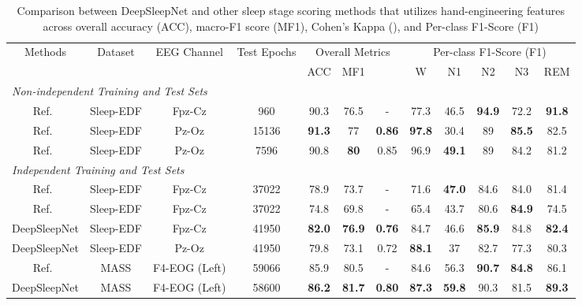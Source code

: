 \documentclass[journal,twoside]{IEEEtran}
\let\MYoriglatexcaption\caption
\renewcommand{\caption}[2][\relax]{\MYoriglatexcaption[#2]{#2}}
\begin{document}
\begin{table*}[!t]
\renewcommand{\arraystretch}{1.3}
\caption{Comparison between DeepSleepNet and other sleep stage scoring methods that utilizes hand-engineering features across overall accuracy (ACC), macro-F1 score (MF1), Cohen's Kappa (), and Per-class F1-Score (F1)}
\label{tab:comparison}
\centering
\begin{tabular}{|c|c|c|c|ccc|ccccc|}
\hline
\multirow{2}{*}{Methods} & \multirow{2}{*}{Dataset} & \multirow{2}{*}{EEG Channel} & \multirow{2}{*}{Test Epochs} & \multicolumn{3}{c|}{Overall Metrics} & \multicolumn{5}{c|}{Per-class F1-Score (F1)} \\
 &  &  &  & ACC & MF1 &  & W & N1 & N2 & N3 & REM \\ \hline
\multicolumn{12}{|l|}{\textit{Non-independent Training and Test Sets}} \\ \hline
Ref.~\cite{hsu2013} & Sleep-EDF & Fpz-Cz & 960 & 90.3 & 76.5 & - & 77.3 & 46.5 & \textbf{94.9} & 72.2 & \textbf{91.8} \\
Ref.~\cite{sharma2017} & Sleep-EDF & Pz-Oz & 15136 & \textbf{91.3} & 77 & \textbf{0.86} & \textbf{97.8} & 30.4 & 89 & \textbf{85.5} & 82.5 \\
Ref.~\cite{hassan2017} & Sleep-EDF & Pz-Oz & 7596 & 90.8 & \textbf{80} & 0.85 & 96.9 & \textbf{49.1} & 89 & 84.2 & 81.2 \\ \hline
\multicolumn{12}{|l|}{\textit{Independent Training and Test Sets}} \\ \hline
Ref.~\cite{tsinalis2016} & Sleep-EDF & Fpz-Cz & 37022 & 78.9 & 73.7 & - & 71.6 & \textbf{47.0} & 84.6 & 84.0 & 81.4 \\
Ref.~\cite{tsinalis2016cnn} & Sleep-EDF & Fpz-Cz & 37022 & 74.8 & 69.8 & - & 65.4 & 43.7 & 80.6 & \textbf{84.9} & 74.5 \\
DeepSleepNet & Sleep-EDF & Fpz-Cz & 41950 & \textbf{82.0} & \textbf{76.9} & \textbf{0.76} & 84.7 & 46.6 & \textbf{85.9} & 84.8 & \textbf{82.4} \\
DeepSleepNet & Sleep-EDF & Pz-Oz & 41950 & 79.8 & 73.1 & 0.72 & \textbf{88.1} & 37 & 82.7 & 77.3 & 80.3 \\
\rule{0pt}{4ex} Ref.~\cite{dong2016lstm} & MASS & F4-EOG (Left) & 59066 & 85.9 & 80.5 & - & 84.6 & 56.3 & \textbf{90.7} & \textbf{84.8} & 86.1 \\
DeepSleepNet & MASS & F4-EOG (Left) & 58600 & \textbf{86.2} & \textbf{81.7} & \textbf{0.80} & \textbf{87.3} & \textbf{59.8} & 90.3 & 81.5 & \textbf{89.3} \\ \hline
\end{tabular}
\end{table*}
\end{document}
